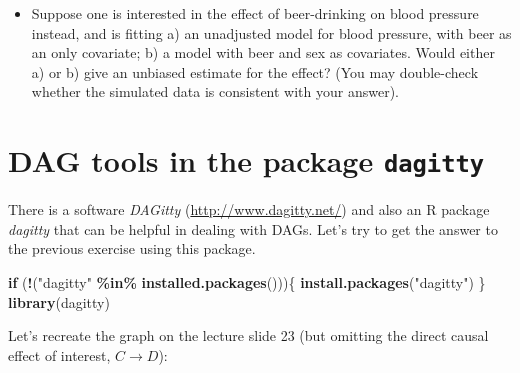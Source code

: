 \documentclass[
]{book}
\newenvironment{Shaded}{\begin{snugshade}}{\end{snugshade}}
\newcommand{\ControlFlowTok}[1]{\textcolor[rgb]{0.13,0.29,0.53}{\textbf{#1}}}
\newcommand{\DecValTok}[1]{\textcolor[rgb]{0.00,0.00,0.81}{#1}}
\newcommand{\FunctionTok}[1]{\textcolor[rgb]{0.13,0.29,0.53}{\textbf{#1}}}
\newcommand{\NormalTok}[1]{#1}
\newcommand{\OtherTok}[1]{\textcolor[rgb]{0.56,0.35,0.01}{#1}}
\newcommand{\SpecialCharTok}[1]{\textcolor[rgb]{0.81,0.36,0.00}{\textbf{#1}}}
\newcommand{\StringTok}[1]{\textcolor[rgb]{0.31,0.60,0.02}{#1}}
\providecommand{\tightlist}{%
  \setlength{\itemsep}{0pt}\setlength{\parskip}{0pt}}
\begin{document}
\begin{Shaded}
\end{Shaded}

\begin{itemize}
\tightlist
\item
  Suppose one is interested in the effect of beer-drinking on blood pressure instead, and is fitting a) an unadjusted model for blood pressure, with beer as an only covariate; b) a model with beer and sex as covariates. Would either a) or b) give an unbiased estimate for the effect? (You may double-check whether the simulated data is consistent with your answer).
\end{itemize}

\section{\texorpdfstring{DAG tools in the package \texttt{dagitty}}{DAG tools in the package dagitty}}\label{dag-tools-in-the-package-dagitty}

There is a software \emph{DAGitty} (\url{http://www.dagitty.net/}) and also an R package \emph{dagitty} that can be helpful in dealing with DAGs. Let's try to get the answer to the previous exercise using this package.

\begin{Shaded}
\begin{Highlighting}[]
\ControlFlowTok{if}\NormalTok{ (}\SpecialCharTok{!}\NormalTok{(}\StringTok{"dagitty"} \SpecialCharTok{\%in\%} \FunctionTok{installed.packages}\NormalTok{()))\{}
  \FunctionTok{install.packages}\NormalTok{(}\StringTok{"dagitty"}\NormalTok{)}
\NormalTok{\}}
\FunctionTok{library}\NormalTok{(dagitty)}
\end{Highlighting}
\end{Shaded}

Let's recreate the graph on the lecture slide 23 (but omitting the direct causal effect of interest, \(C \rightarrow D\)):
\end{document}
